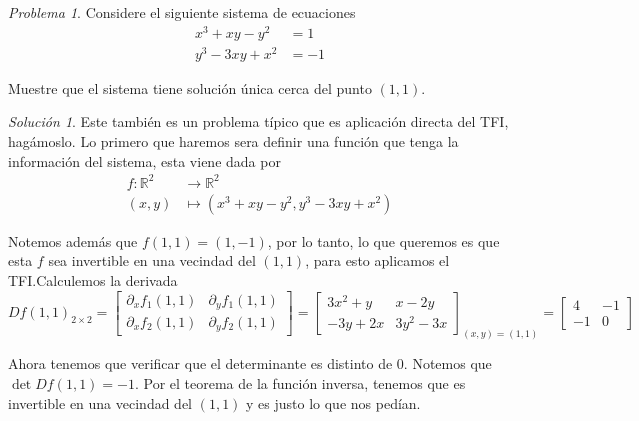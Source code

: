 \documentclass[a4paper,oneside,10.5pt]{article}
\newcommand\RR{\mathbb{R}}
\theoremstyle{definition}
\theoremstyle{plain}
\theoremstyle{remark}
\theoremstyle{theorem}
\newtheorem{prob}{Problema}
\newtheorem{sol}{Solución}
\begin{document}
\begin{prob}
    Considere el siguiente sistema de ecuaciones
    \begin{align*}
        x^3 + xy - y^2 &= 1\\
        y^3 - 3xy + x^2 &= -1
    \end{align*}

    Muestre que el sistema tiene solución única cerca del punto $(1, 1)$.
\end{prob}
\begin{sol}
    Este también es un problema típico que es aplicación directa del TFI, hagámoslo. Lo primero que haremos sera definir una función que tenga la información del sistema, esta viene dada por
    \begin{align*}
        f : \RR^2 &\to \RR^2\\
        (x, y) &\mapsto (x^3 + xy - y^2, y^3 - 3xy + x^2)
    \end{align*}

    Notemos además que $f(1, 1) = (1, -1)$, por lo tanto, lo que queremos es que esta $f$ sea invertible en una vecindad del $(1, 1)$, para esto aplicamos el TFI.\@ Calculemos la derivada
    \begin{equation*}
        {Df(1, 1)}_{2 \times 2} = \begin{bmatrix}
            \partial_x f_1(1, 1) & \partial_y f_1(1, 1)\\
            \partial_x f_2(1, 1) & \partial_y f_2(1, 1)
        \end{bmatrix} = \begin{bmatrix}
            3x^2 + y & x - 2y\\
            -3y + 2x & 3y^2 - 3x
        \end{bmatrix}_{(x, y) = (1, 1)} = \begin{bmatrix}
            4 & -1\\
            -1 & 0
        \end{bmatrix}
    \end{equation*}

    Ahora tenemos que verificar que el determinante es distinto de $0$. Notemos que $\det Df(1, 1) = -1$. Por el teorema de la función inversa, tenemos que es invertible en una vecindad del $(1, 1)$ y es justo lo que nos pedían.
\end{sol}
\end{document}
